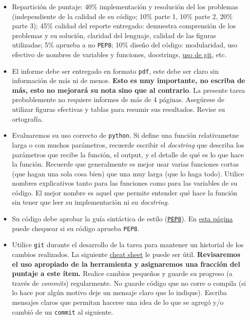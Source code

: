 \documentclass[letter, 11pt]{article}
\begin{document}
\pagebreak
{}
\begin{itemize}

\item Repartición de puntaje: 40\% implementación y resolución del los
   problemas (independiente de la calidad de su código; 10\% parte 1, 10\%
   parte 2, 20\% parte 3); 45\% calidad del
   reporte entregado: demuestra comprensión de los problemas y su solución,
   claridad del lenguaje, calidad de las figuras utilizadas; 5\% aprueba a no
   \texttt{PEP8}; 10\% diseño del código: modularidad, uso efectivo de nombres
   de variables y funciones, docstrings, \underline{uso de git}, etc.

\item El informe debe ser entregado en formato \texttt{pdf}, este debe ser
  claro sin información de más ni de menos. \textbf{Esto es muy importante, no
  escriba de más, esto no mejorará su nota sino que al contrario}. La presente
  tarea probablemente no requiere informes de más de 4 páginas. Asegúrese de
  utilizar figuras efectivas y tablas para resumir sus resultados. Revise su
  ortografía.

  \item Evaluaremos su uso correcto de \texttt{python}. Si define una función
  relativametne larga o con muchos parámetros, recuerde escribir el
  \emph{docstring} que describa los parámetros que recibe la función, el
  output, y el detalle de qué es lo que hace la función. Recuerde que
  generalmente es mejor usar varias funciones cortas (que hagan una sola cosa
  bien) que una muy larga (que lo haga todo).  Utilice nombres explicativos
  tanto para las funciones como para las variables de su código. El mejor
  nombre es aquel que permite entender qué hace la función sin tener que leer
  su implementación ni su \emph{docstring}.

\item Su código debe aprobar la guía sintáctica de estilo
  (\href{https://www.python.org/dev/peps/pep-0008/}{\texttt{PEP8}}). En
  \href{http://pep8online.com}{esta página} puede chequear si su código aprueba
  \texttt{PEP8}.

\item Utilice \texttt{git} durante el desarrollo de la tarea para mantener un
  historial de los cambios realizados. La siguiente
  \href{https://education.github.com/git-cheat-sheet-education.pdf}{cheat
    sheet} le puede ser útil. {\bf Revisaremos el uso apropiado de la
  herramienta y asignaremos una fracción del puntaje a este ítem.} Realice
  cambios pequeños y guarde su progreso (a través de \emph{commits})
  regularmente. No guarde código que no corre o compila (si lo hace por algún
  motivo deje un mensaje claro que lo indique). Escriba mensajes claros que
  permitan hacerse una idea de lo que se agregó y/o cambió de un
  \texttt{commit} al siguiente.


\end{itemize}
\end{document}
